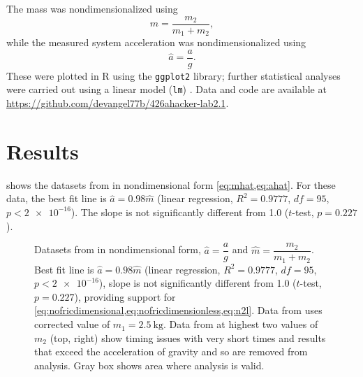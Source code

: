\documentclass[reprint,amsmath,amssymb,aps,twoside]{revtex4-2}
\begin{document}
The mass was nondimensionalized using
\begin{equation}
\hat{m} = \dfrac{m_2}{m_1+m_2}, \label{eq:mhat}
\end{equation}
while the measured system acceleration was nondimensionalized using
\begin{equation}
\hat{a} = \dfrac{a}{g}. \label{eq:ahat}
\end{equation}
These were plotted in R using the \texttt{ggplot2} library; further statistical analyses were carried out using a linear model (\texttt{lm}) \cite{R-2024,ggplot2-2024}. Data and code are available at \url{https://github.com/devangel77b/426ahacker-lab2.1}. 





\section{Results}
 shows the datasets from \cite{arenas-2024-testing,avalur-2024-verifying,canada-2024-experimental,kishore-2024-relationship,yagnyeshwaran-2024-verifying,govardhanen-2024-newtons,kedharnath-2024-examining,krasnopolsky-2024-testing,perle-2024-experimental} in nondimensional form \cref{eq:mhat,eq:ahat}. For these data, the best fit line is $\hat{a}=0.98\hat{m}$ (linear regression, $R^2=0.9777$, $df=95$, $p<\num{2e-16}$). The slope is not significantly different from 1.0 ($t$-test, $p=0.227$).
\begin{figure*}

\caption{\label{fig:results} Datasets from \cite{arenas-2024-testing,avalur-2024-verifying,canada-2024-experimental,kishore-2024-relationship,yagnyeshwaran-2024-verifying,govardhanen-2024-newtons,kedharnath-2024-examining,krasnopolsky-2024-testing,perle-2024-experimental} in nondimensional form, $\hat{a}=\dfrac{a}{g}$ and $\hat{m}=\dfrac{m_2}{m_1+m_2}$. Best fit line is $\hat{a}=0.98\hat{m}$ (linear regression, $R^2=0.9777$, $df=95$, $p<\num{2e-16}$), slope is not significantly different from 1.0 ($t$-test, $p=0.227$), providing support for \cref{eq:nofricdimensional,eq:nofricdimensionless,eq:n2l}. Data from \cite{govardhanen-2024-newtons} uses corrected value of $m_1=\qty{2.5}{\kilo\gram}$. Data from \cite{krasnopolsky-2024-testing} at highest two values of $m_2$ (top, right) show timing issues with very short times and results that exceed the acceleration of gravity and so are removed from analysis. Gray box shows area where analysis is valid.}
\end{figure*}
\end{document}
